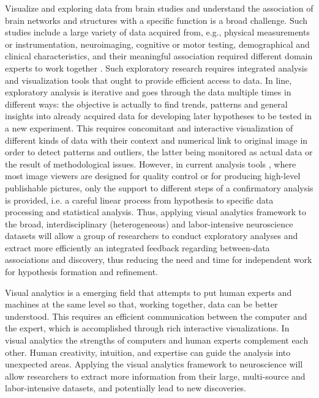 \documentclass[utf8]{frontiersSCNS} %
\begin{document}
Visualize and exploring data from brain studies and understand the association of brain networks and structures with a specific function is a broad challenge. Such studies include a large variety of data acquired from, e.g., physical measurements or instrumentation, neuroimaging, cognitive or motor testing, demographical and clinical characteristics, and their meaningful association required different domain experts to work together   . Such exploratory research requires integrated analysis and visualization tools that ought to provide efficient access to data. In line, exploratory analysis is iterative and goes through the data multiple times in different ways: the objective is actually to find trends, patterns and general insights into already acquired data for developing later hypotheses to be tested in a new experiment. This requires concomitant and interactive visualization of different kinds of data with their context and numerical link to original image in order to detect patterns and outliers, the latter being monitored as actual data or the result of methodological issues. However, in current analysis tools  , where most image viewers are designed for quality control or for producing high-level publishable pictures, only the support to different steps of a confirmatory analysis is provided, i.e. a careful linear process from hypothesis to specific data processing and statistical analysis. Thus, applying visual analytics framework to the broad, interdisciplinary (heterogeneous) and labor-intensive neuroscience datasets will allow a group of researchers to conduct exploratory analyses and extract more efficiently an integrated feedback regarding between-data associations and discovery, thus reducing the need and time for independent work for hypothesis formation and refinement.


Visual analytics\citep{cook_illuminating_2005} is a emerging field that attempts to put human experts and machines at the same level so that, working together, data can be better understood. This requires an efficient communication between the computer and the expert, which is accomplished through rich interactive visualizations. In visual analytics the strengths of computers and human experts complement each other. Human creativity, intuition, and expertise can guide the analysis into unexpected areas. Applying the visual analytics framework to neuroscience will allow researchers to extract more information from their large, multi-source and labor-intensive datasets, and potentially lead to new discoveries.
\end{document}
